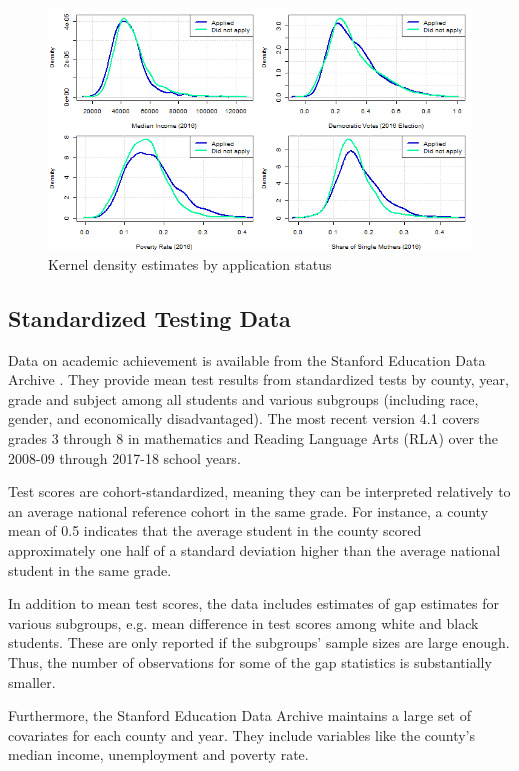 \begin{figure}[!h]
	\centering
	\includegraphics[scale=0.7]{"../Code & Data/AssistanceCovDensity.png"}
	\caption{Kernel density estimates by application status}
	\label{AssistCovDensity}
\end{figure}


\subsection{Standardized Testing Data}

Data on academic achievement is available from the Stanford Education Data Archive \citep{SEDA}. They provide mean test results from standardized tests by county, year, grade and subject among all students and various subgroups (including race, gender, and economically disadvantaged). The most recent version 4.1 covers grades 3 through 8 in mathematics and Reading Language Arts (RLA) over the 2008-09 through 2017-18 school years.

Test scores are cohort-standardized, meaning they can be interpreted relatively to an average national reference cohort in the same grade. For instance, a county mean of 0.5 indicates that the average student in the county scored approximately one half of a standard deviation higher than the average national student in the same grade.

In addition to mean test scores, the data includes estimates of gap estimates for various subgroups, e.g. mean difference in test scores among white and black students. These are only reported if the subgroups' sample sizes are large enough. Thus, the number of observations for some of the gap statistics is substantially smaller.

Furthermore, the Stanford Education Data Archive maintains a large set of covariates for each county and year. They include variables like the county's median income, unemployment and poverty rate.


